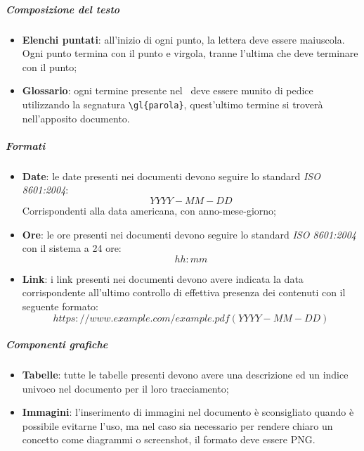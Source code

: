 \documentclass[../NormeDiProgetto_v4.0.0.tex]{subfiles}
\begin{document}
				\subparagraph{Composizione del testo}
				\begin{itemize}
				\item \textbf{Elenchi puntati}: all'inizio di ogni punto, la lettera deve essere maiuscola. Ogni punto termina con il punto e virgola, tranne l'ultima che deve terminare con il punto;
				\item \textbf{Glossario}: ogni termine presente nel \glossario\ deve essere munito di pedice utilizzando la segnatura \verb|\gl{parola}|, quest'ultimo termine si troverà nell'apposito documento.
				\end{itemize}

				\subparagraph{Formati}
				\begin{itemize}
				\item \textbf{Date}: le date presenti nei documenti devono seguire lo standard \textit{ISO 8601:2004}:\\
				\begin{equation*}
					YYYY-MM-DD
				\end{equation*}
				Corrispondenti alla data americana, con anno-mese-giorno;
				\item \textbf{Ore}: le ore presenti nei documenti devono seguire lo standard \textit{ISO 8601:2004}
				con il sistema a 24 ore:\\
					\begin{equation*}
							hh:mm
					\end{equation*}
				\item \textbf{Link}: i link presenti nei documenti devono avere indicata la data corrispondente all'ultimo controllo di effettiva presenza dei contenuti con il seguente formato:\\
				\begin{equation*}
					https://www.example.com/example.pdf(YYYY-MM-DD)
					\end{equation*}
				\end{itemize}

				\subparagraph{Componenti grafiche}
				\begin{itemize}

				\item \textbf{Tabelle}: tutte le tabelle presenti devono avere una descrizione ed un indice univoco nel documento per il loro tracciamento;
				\item \textbf{Immagini}: l'inserimento di immagini nel documento è sconsigliato quando è possibile evitarne l'uso, ma nel caso sia necessario per rendere chiaro un concetto come diagrammi o screenshot, il formato deve essere PNG.
				\end{itemize}
\end{document}
